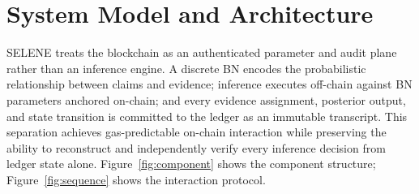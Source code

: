 \documentclass[journal]{IEEEtran}
\theoremstyle{definition}
\theoremstyle{remark}
\begin{document}
\begin{table}[t]
\centering
\caption{Comparison of oracle designs along inference,
accountability, and gas cost dimensions.}
\label{tab:oracle-comparison}
\end{table}


\section{System Model and Architecture}
\label{sec:proposed-methodology}

SELENE treats the blockchain as an authenticated parameter
and audit plane rather than an inference engine.
A discrete BN encodes the probabilistic relationship
between claims and evidence; inference executes off-chain
against BN parameters anchored on-chain; and every
evidence assignment, posterior output, and state
transition is committed to the ledger as an immutable
transcript.
This separation achieves gas-predictable on-chain
interaction while preserving the ability to reconstruct
and independently verify every inference decision from
ledger state alone.
Figure~\ref{fig:component} shows the component structure;
Figure~\ref{fig:sequence} shows the interaction protocol.
\end{document}
